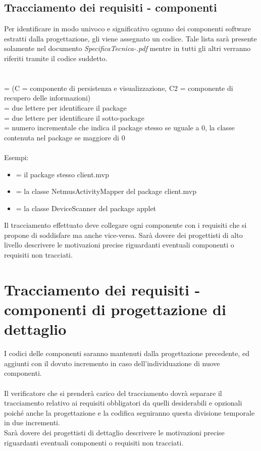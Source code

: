 \subsection{Tracciamento dei requisiti - componenti}
Per identificare in modo univoco e significativo ognuno dei componenti software
estratti dalla progettazione, gli viene assegnato un codice.
Tale lista sar\`a presente solamente nel documento
\emph{SpecificaTecnica-\versioneST.pdf} mentre in tutti gli altri verranno
riferiti tramite il codice suddetto.
\\
\\
\\
 = (C = componente di persistenza e visualizzazione, C2 = componente di
recupero delle informazioni)\\  = due lettere per identificare il
package\\  = due lettere per identificare il sotto-package\\
 = numero incrementale che indica il package stesso se uguale a 0, la
classe contenuta nel package se maggiore di 0\\ \\
Esempi:
\begin{itemize}
  \item {} = il package stesso client.mvp
  \item {} = la classe NetmusActivityMapper del package client.mvp
  \item {} = la classe DeviceScanner del package applet
\end{itemize}

Il tracciamento effettuato deve collegare ogni componente con i requisiti che si
propone di soddisfare ma anche vice-versa. Sar\`a dovere dei progettisti di alto
livello descrivere le motivazioni precise riguardanti eventuali componenti o
requisiti non tracciati.

\section{Tracciamento dei requisiti - componenti di progettazione di dettaglio}
I codici delle componenti saranno mantenuti dalla progettazione precedente, ed
aggiunti con il dovuto incremento in caso dell'individuazione di nuove
componenti.\\\\
Il verificatore che si prender\`a carico del tracciamento dovr\`a separare il
tracciamento relativo ai requisiti obbligatori da quelli desiderabili e
opzionali poich\'e anche la progettazione e la codifica seguiranno questa
divisione temporale in due incrementi.\\
Sar\`a dovere dei progettisti di dettaglio descrivere le motivazioni precise
riguardanti eventuali componenti o requisiti non tracciati.

